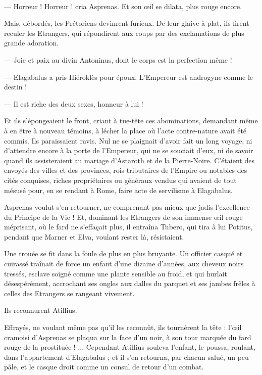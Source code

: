 \documentclass[a4paper, 11pt, oneside, polutonikogreek, french]{article}
\begin{document}
\paragraph{}
--- Horreur ! Horreur ! cria Asprenas. Et son œil se dilata, plus rouge encore.

Mais, débordés, les Prétoriens devinrent furieux. De leur glaive à plat, ils firent reculer les Etrangers, qui répondirent aux coups par des exclamations de plus grande adoration.

--- Joie et paix au divin Antoninus, dont le corps est la perfection même !

--- Elagabalus a pris Hiéroklès pour époux. L'Empereur est androgyne comme le destin !

--- Il est riche des deux sexes, honneur à lui !

Et ils s'épongeaient le front, criant à tue-tête ces abominations, demandant même à en être à nouveau témoins, à lécher la place où l'acte contre-nature avait été commis. Ils paraissaient ravis. Nul ne se plaignait d'avoir fait un long voyage, ni d'attendre encore à la porte de l'Empereur, qui ne se souciait d'eux, ni de savoir quand ils assisteraient au mariage d'Astaroth et de la Pierre-Noire. C'étaient des envoyés des villes et des provinces, rois tributaires de l'Empire ou notables des cités conquises, riches propriétaires ou généraux vendus qui avaient de tout mésusé pour, en se rendant à Rome, faire acte de servilisme à Elagabalus.

Asprenas voulut s'en retourner, ne comprenant pas mieux que jadis l'excellence du Principe de la Vie ! Et, dominant les Etrangers de son immense œil rouge méprisant, où le fard ne s'effaçait plus, il entraîna Tubero, qui tira à lui Potitus, pendant que Marner et Elva, voulant rester là, résistaient.

Une trouée se fit dans la foule de plus en plus bruyante. Un officier casqué et cuirassé traînait de force un enfant d'une dizaine d'années, aux cheveux noirs tressés, esclave soigné comme une plante sensible au froid, et qui hurlait désespérément, accrochant ses ongles aux dalles du parquet et ses jambes frêles à celles des Etrangers se rangeant vivement.

Ils reconnurent Atillius.

Effrayés, ne voulant même pas qu'il les reconnût, ils tournèrent la tête : l'œil cramoisi d'Asprenas se plaqua sur la face d'un noir, à son tour marquée du fard rouge de la prostituée ! ... Cependant Atillius souleva l'enfant, le poussa, roulant, dans l'appartement d'Elagabalus ; et il s'en retourna, par chacun salué, un peu pâle, et le casque droit comme un consul de retour d'un combat.
\end{document}
